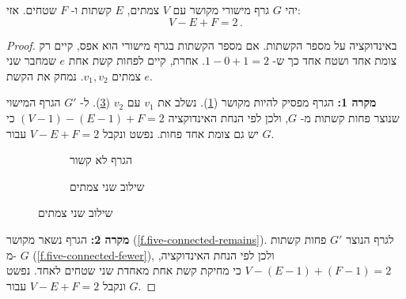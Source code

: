 \begin{theorem}[\L{Euler}]\label{thm.euler}
יהי
$G$
גרף מישורי מקושר עם
$V$
צמתים,
$E$
קשתות ו-%
$F$
שטחים. אזי:
\[
V-E+F=2\,.
\]
\end{theorem}
\begin{proof}
באינדוקציה על מספר הקשתות. אם מספר הקשתות בגרף מישורי הוא אפס, קיים רק צומת אחד ושטח אחד כך ש-%
$1-0+1=2$.
אחרת, קיים לפחות קשת אחת
$e$
שמחבר שני צמתים
$v_1,v_2$.
נמחק את הקשת
$e$.

\textbf{מקרה 1:}
הגרף מפסיק להיות מקושר
(\ref{f.five-disconnected-removing}).
נשלב את
$v_1$
עם
$v_2$
(\ref{f.five-disconnected-merge}).
ל-%
$G'$
הגרף המישוי שנוצר פחות קשתות מ-%
$G$,
ולכן לפי הנחת האינדוקציה
$(V-1)-(E-1)+F=2$
כי יש גם צומת אחד פחות. נפשט ונקבל
$V-E+F=2$
עבור
$G$.

\begin{figure}[tb]
\begin{center}
\begin{subfigure}{.4\textwidth}
\caption{הגרף לא קשור}\label{f.five-disconnected-removing}
\end{subfigure}
\hspace{3em}
\begin{subfigure}{.4\textwidth}
\caption{שילוב שני צמתים}\label{f.five-disconnected-merge}
\end{subfigure}
\end{center}
\end{figure}

\textbf{מקרה 2:}
הגרף נשאר מקושר
(\ref{f.five-connected-remains}).
לגרף הנוצר
$G'$
פחות קשתות מ-%
$G$
(\ref{f.five-connected-fewer}),
ולכן לפי הנחת האינדוקציה,
$V-(E-1)+(F-1)=2$
כי מחיקת קשת אחת מאחדת שני שטחים לאחד. נפשט ונקבל
$V-E+F=2$ 
עבור
$G$.
\end{proof}

